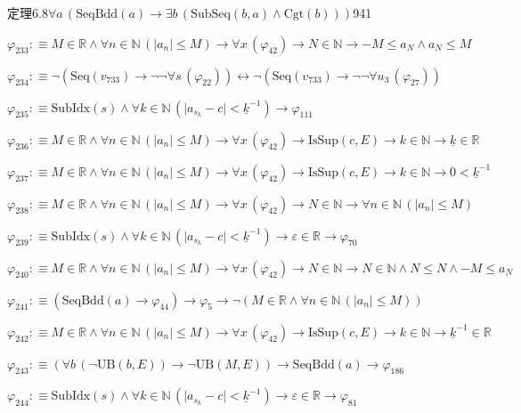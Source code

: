 \begin{fullproof}{定理6.8}{$\forall a\,(\mathrm{SeqBdd}(a) \to \exists b\,(\mathrm{SubSeq}(b,a) \land \mathrm{Cgt}(b)))$}{941}
\begin{abbrevlist}
\item $\varphi_{233} :\equiv M \in \mathbb{R} \land \forall n \in \mathbb{N}\,(\lvert a_{n} \rvert \leq M) \to \forall x\,(\varphi_{42}) \to N \in \mathbb{N} \to -M \leq a_{N} \land a_{N} \leq M$
\item $\varphi_{234} :\equiv \neg (\mathrm{Seq}(v_{733}) \to \neg \neg \forall s\,(\varphi_{22})) \leftrightarrow \neg (\mathrm{Seq}(v_{733}) \to \neg \neg \forall u_{3}\,(\varphi_{27}))$
\item $\varphi_{235} :\equiv \mathrm{SubIdx}(s) \land \forall k \in \mathbb{N}\,(\lvert a_{s_{k}} - c \rvert < \underline{k}^{-1}) \to \varphi_{111}$
\item $\varphi_{236} :\equiv M \in \mathbb{R} \land \forall n \in \mathbb{N}\,(\lvert a_{n} \rvert \leq M) \to \forall x\,(\varphi_{42}) \to \mathrm{IsSup}(c,E) \to k \in \mathbb{N} \to \underline{k} \in \mathbb{R}$
\item $\varphi_{237} :\equiv M \in \mathbb{R} \land \forall n \in \mathbb{N}\,(\lvert a_{n} \rvert \leq M) \to \forall x\,(\varphi_{42}) \to \mathrm{IsSup}(c,E) \to k \in \mathbb{N} \to 0 < \underline{k}^{-1}$
\item $\varphi_{238} :\equiv M \in \mathbb{R} \land \forall n \in \mathbb{N}\,(\lvert a_{n} \rvert \leq M) \to \forall x\,(\varphi_{42}) \to N \in \mathbb{N} \to \forall n \in \mathbb{N}\,(\lvert a_{n} \rvert \leq M)$
\item $\varphi_{239} :\equiv \mathrm{SubIdx}(s) \land \forall k \in \mathbb{N}\,(\lvert a_{s_{k}} - c \rvert < \underline{k}^{-1}) \to \varepsilon \in \mathbb{R} \to \varphi_{70}$
\item $\varphi_{240} :\equiv M \in \mathbb{R} \land \forall n \in \mathbb{N}\,(\lvert a_{n} \rvert \leq M) \to \forall x\,(\varphi_{42}) \to N \in \mathbb{N} \to N \in \mathbb{N} \land N \leq N \land -M \leq a_{N}$
\item $\varphi_{241} :\equiv (\mathrm{SeqBdd}(a) \to \varphi_{44}) \to \varphi_{5} \to \neg (M \in \mathbb{R} \land \forall n \in \mathbb{N}\,(\lvert a_{n} \rvert \leq M))$
\item $\varphi_{242} :\equiv M \in \mathbb{R} \land \forall n \in \mathbb{N}\,(\lvert a_{n} \rvert \leq M) \to \forall x\,(\varphi_{42}) \to \mathrm{IsSup}(c,E) \to k \in \mathbb{N} \to \underline{k}^{-1} \in \mathbb{R}$
\item $\varphi_{243} :\equiv (\forall b\,(\neg \mathrm{UB}(b,E)) \to \neg \mathrm{UB}(M,E)) \to \mathrm{SeqBdd}(a) \to \varphi_{186}$
\item $\varphi_{244} :\equiv \mathrm{SubIdx}(s) \land \forall k \in \mathbb{N}\,(\lvert a_{s_{k}} - c \rvert < \underline{k}^{-1}) \to \varepsilon \in \mathbb{R} \to \varphi_{81}$

\end{abbrevlist}
\end{fullproof}
